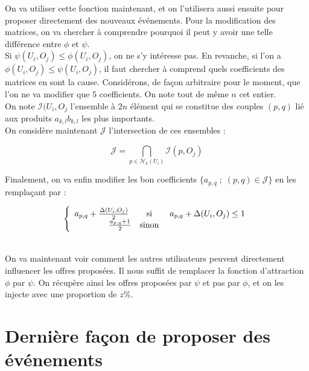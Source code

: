 \documentclass[11pt, oneside]{article}
\begin{document}
On va utiliser cette fonction maintenant, et on l'utilisera aussi ensuite pour proposer directement des nouveaux événements. Pour la modification des matrices, on va chercher à comprendre pourquoi il peut y avoir une telle différence entre $\phi$ et $\psi$. \\
 Si $\psi(U_i,O_j) \leq \phi(U_i,O_j)$, on ne s'y intéresse pas. En revanche, si l'on a $\phi(U_i,O_j) \leq \psi(U_i,O_j)$, il faut chercher à comprend quels coefficients des matrices en sont la cause. Considérons, de façon arbitraire pour le moment, que l'on ne va modifier que $5$ coefficients. On note tout de même $n$ cet entier. \\
On note $\mathcal{I} (U_i,O_j$ l'ensemble à $2n$ élément qui se constitue des couples $(p,q)$ lié aux produits $a_{k,l}b_{k,l} $ les plus importants. \\
On considère maintenant $\mathcal{J}$ l'intersection de ces ensembles :
\begin{center}
\[
\mathcal{J} = \bigcap _{p \in \mathcal{N} _k (U_i) } \mathcal{I} (p,O_j)
\]

\end{center}

Finalement, on va enfin modifier les bon coefficients $\{a_{p,q} \; ; \; (p,q) \in \mathcal{J} \} $ en les remplaçant par :
\begin{center}
\[
 \left \{
   \begin{array}{r c l}
       a_{p,q} + \frac{\Delta (U_i,O_j)}{2} \;  &\text{si}& \; a_{p,q} + \Delta (U_i,O_j) \leq 1  \\
       \frac{ a_{p,q} + 1}{2} &\text{sinon}& \\
   \end{array}
   \right .
\]
\end{center}
\\

On va maintenant voir comment les autres utilisateurs peuvent directement influencer les offres proposées. Il nous suffit de remplacer la fonction d'attraction $\phi$ par $\psi$. On récupère ainsi les offres proposées par $\psi$ et pas par $\phi$, et on les injecte avec une proportion de $z \%$.

\section{Dernière façon de proposer des événements}
\end{document}
